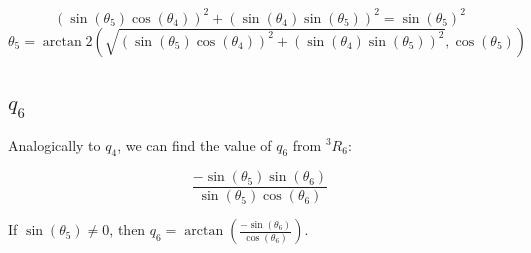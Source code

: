 \documentclass{article}
\begin{document}
\[\left(\sin(\theta_5) \cos(\theta_4)\right)^2 + \left(\sin(\theta_4) \sin(\theta_5)\right)^2 = \sin(\theta_5)^2\]
\[ \theta_5= \arctan2(\sqrt{\left(\sin(\theta_5) \cos(\theta_4)\right)^2 + \left(\sin(\theta_4) \sin(\theta_5)\right)^2}, \cos(\theta_5)) \]



\subsection{$q_6$}

Analogically to $q_4$, we can find the value of $q_6$ from ${}^3R_6$:

\[\frac{-\sin(\theta_5) \sin(\theta_6)}{\sin(\theta_5) \cos(\theta_6)}\]

If $\sin(\theta_5) \neq 0$, then $q_6 = \arctan(\frac{-\sin(\theta_6)}{\cos(\theta_6)})$. 








\end{document}
